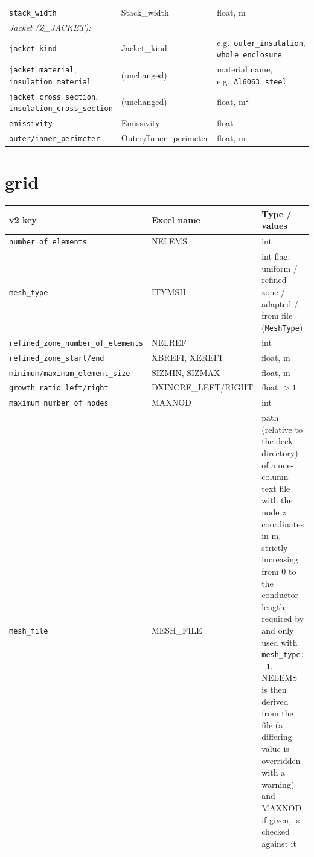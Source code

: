 \documentclass[10pt,a4paper]{article}
\newcommand{\code}[1]{\texttt{#1}}
\begin{document}
\begin{longtable}{p{7.0cm}p{3.2cm}p{5.0cm}}
\code{stack\_width} & Stack\_width & float, m \\
\multicolumn{3}{l}{\emph{Jacket (Z\_JACKET):}} \\
\code{jacket\_kind} & Jacket\_kind & e.g.\ \code{outer\_insulation}, \code{whole\_enclosure} \\
\code{jacket\_material}, \code{insulation\_material} & (unchanged) & material name, e.g.\ \code{Al6063}, \code{steel} \\
\code{jacket\_cross\_section}, \code{insulation\_cross\_section} & (unchanged) & float, m$^2$ \\
\code{emissivity} & Emissivity & float \\
\code{outer/inner\_perimeter} & Outer/Inner\_perimeter & float, m \\
\bottomrule
\end{longtable}

\section*{grid}

\begin{longtable}{p{5.6cm}p{3.4cm}p{6.2cm}}
\toprule
\textbf{v2 key} & \textbf{Excel name} & \textbf{Type / values} \\
\midrule
\endhead
\code{number\_of\_elements} & NELEMS & int \\
\code{mesh\_type} & ITYMSH & int flag: uniform / refined zone / adapted / from file (\code{MeshType}) \\
\code{refined\_zone\_number\_of\_elements} & NELREF & int \\
\code{refined\_zone\_start/end} & XBREFI, XEREFI & float, m \\
\code{minimum/maximum\_element\_size} & SIZMIN, SIZMAX & float, m \\
\code{growth\_ratio\_left/right} & DXINCRE\_LEFT/RIGHT & float $>1$ \\
\code{maximum\_number\_of\_nodes} & MAXNOD & int \\
\code{mesh\_file} & MESH\_FILE & path (relative to the deck directory) of a one-column text file with the node $z$ coordinates in m, strictly increasing from 0 to the conductor length; required by and only used with \code{mesh\_type: -1}. NELEMS is then derived from the file (a differing value is overridden with a warning) and MAXNOD, if given, is checked against it \\
\bottomrule
\end{longtable}
\end{document}
